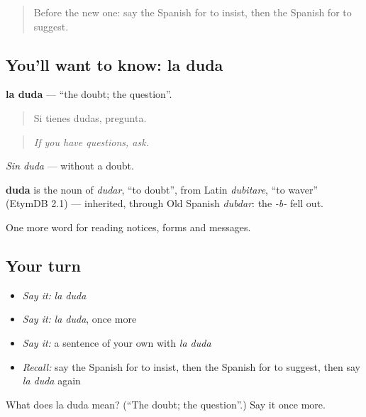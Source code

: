 \label{lesson:ES-C493-duda}



\begin{quote}
Before the new one: say the Spanish for to insist, then the Spanish for to suggest.
\end{quote}

\subsection*{You'll want to know: la duda}
\textbf{la duda} — \textquotedblleft{}the doubt; the question\textquotedblright{}.

\begin{quote}
Si tienes dudas, pregunta.
\end{quote}

\begin{quote}
\emph{If you have questions, ask.}
\end{quote}

\emph{Sin duda} — without a doubt.

\begin{cousinweb}
\textbf{duda} is the noun of \emph{dudar}, \textquotedblleft{}to doubt\textquotedblright{}, from Latin \emph{dubitare}, \textquotedblleft{}to waver\textquotedblright{} (EtymDB 2.1) — inherited, through Old Spanish \emph{dubdar}: the \emph{-b-} fell out.
\end{cousinweb}

\begin{grammarlens}[title={What you've built}]
One more word for reading notices, forms and messages.
\end{grammarlens}

\subsection*{Your turn}
\begin{itemize}
\raggedright
  \item \emph{Say it:} \emph{la duda}
  \item \emph{Say it:} \emph{la duda}, once more
  \item \emph{Say it:} a sentence of your own with \emph{la duda}
  \item \emph{Recall:} say the Spanish for to insist, then the Spanish for to suggest, then say \emph{la duda} again
\end{itemize}

\begin{tcolorbox}[breakable,colback=teal!4,colframe=teal!35!black,title={Before you move on}]
What does la duda mean? (\textquotedblleft{}The doubt; the question\textquotedblright{}.) Say it once more.
\end{tcolorbox}
